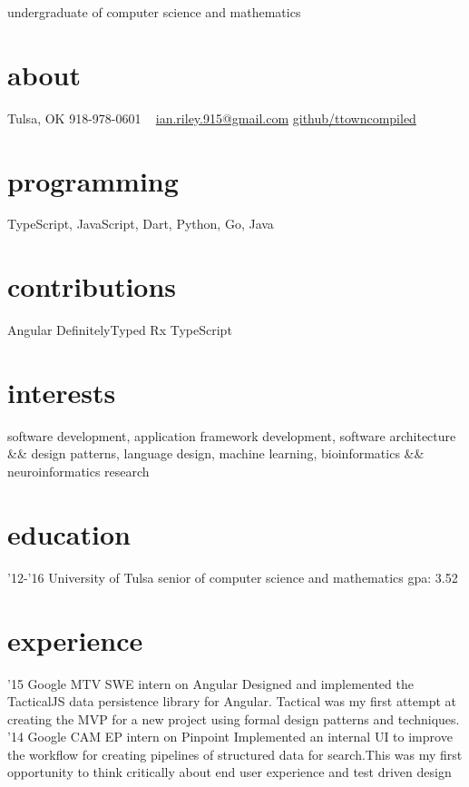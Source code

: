 \documentclass[]{friggeri-cv}
\begin{document}
       {undergraduate of computer science and mathematics}


\begin{aside}
  \section{about}
    Tulsa, OK
    918-978-0601
    ~
    \href{mailto:ian.riley.915@gmail.com}{ian.riley.915@gmail.com}
    \href{https://github.com/ttowncompiled}{github/ttowncompiled}
  \section{programming}
    TypeScript, JavaScript, Dart, Python, Go, Java
  \section{contributions}
    Angular
    DefinitelyTyped
    Rx
    TypeScript
\end{aside}

\section{interests}
software development, application framework development, software architecture \&\& design patterns, language design, machine learning, bioinformatics \&\& neuroinformatics research

\section{education}

\begin{entrylist}
  \entry
    {'12-'16}
    {University of Tulsa}
    {senior of computer science and mathematics}
    {gpa: 3.52}
\end{entrylist}

\section{experience}

\begin{entrylist}
  \entry
    {'15}
    {Google MTV}
    {SWE intern on Angular}
    {Designed and implemented the TacticalJS data persistence library for Angular. Tactical was my first attempt at creating the MVP for a new project using formal design patterns and techniques.}
  \entry
    {'14}
    {Google CAM}
    {EP intern on Pinpoint}
    {Implemented an internal UI to improve the workflow for creating pipelines of structured data for search.This was my first opportunity to think critically about end user experience and test driven design}
\end{entrylist}
\end{document}
